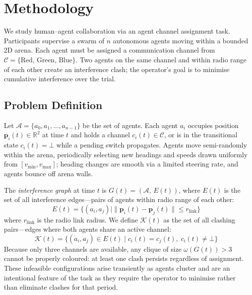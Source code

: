 \documentclass[10pt]{article}
\theoremstyle{definition}
\begin{document}
\section{Methodology}\label{sec:task}
We study human--agent collaboration via an agent channel assignment task. Participants supervise a swarm of $n$ autonomous agents moving within a bounded 2D arena. Each agent must be assigned a communication channel from $\mathcal{C} = \{\text{Red},\,\text{Green},\,\text{Blue}\}$. Two agents on the same channel and within radio range of each other create an interference clash; the operator's goal is to minimise cumulative interference over the trial.

\subsection{Problem Definition}\label{sec:problem}
Let $\mathcal{A} = \{a_0, a_1, \ldots, a_{n-1}\}$ be the set of agents. Each agent $a_i$ occupies position $\mathbf{p}_i(t) \in \mathbb{R}^2$ at time $t$ and holds a channel $c_i(t) \in \mathcal{C}$, or is in the transitional state $c_i(t) = \bot$ while a pending switch propagates. Agents move semi-randomly within the arena, periodically selecting new headings and speeds drawn uniformly from $[v_{\min}, v_{\max}]$; heading changes are smooth via a limited steering rate, and agents bounce off arena walls.

The \emph{interference graph} at time $t$ is $G(t) = (\mathcal{A},\,E(t))$, where $E(t)$ is the set of all interference edges---pairs of agents within radio range of each other:
\begin{equation}
  E(t) = \bigl\{(a_i, a_j) \mid \|\mathbf{p}_i(t) - \mathbf{p}_j(t)\| \leq r_{\mathrm{link}}\bigr\}
  \label{eq:edge}
\end{equation}
where $r_{\mathrm{link}}$ is the radio link radius. We define $\mathcal{K}(t)$ as the set of all clashing pairs---edges where both agents share an active channel:
\begin{equation}
  \mathcal{K}(t) = \bigl\{(a_i,a_j)\in E(t) \mid c_i(t) = c_j(t),\;c_i(t)\neq\bot\bigr\}
  \label{eq:clash}
\end{equation}
Because only three channels are available, any clique of size $\omega(G(t)) > 3$ cannot be properly coloured: at least one clash persists regardless of assignment. These infeasible configurations arise transiently as agents cluster and are an intentional feature of the task as they require the operator to minimise rather than eliminate clashes for that period.
\end{document}
